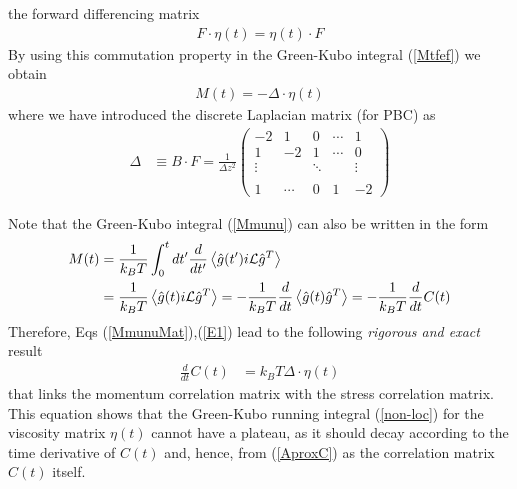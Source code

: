 \documentclass[a4paper,openright,12pt]{book}
\newcommand{\esc}{\!\cdot\!}
\newcommand{\llangle}{\left\langle}
\newcommand{\rrangle}{\right\rangle}
\begin{document}
the forward differencing matrix
\begin{align}
  F\esc\eta(t)=\eta(t)\esc F
\label{commute}
\end{align}
By using this commutation property 
 in the Green-Kubo
integral (\ref{Mtfef}) we obtain
\begin{align}
  M(t)=-\Delta\esc \eta(t)
\label{MmunuMat}
\end{align}
where we have introduced  the discrete Laplacian matrix (for PBC) as
\begin{align}
\Delta&\equiv  B\esc F
=\frac{1}{\Delta z^2}\left(
    \begin{array}{rrrrr}
-2&1&0&\cdots&1\\
1&-2&1&\cdots&0\\
\vdots      &&\ddots&&\vdots\\
\\
1&\cdots&0&1&-2    \end{array}
\right)
\end{align}

Note that the Green-Kubo integral (\ref{Mmunu}) can also be written
in the form
\begin{align}
    M(t)&= \frac{1}{k_BT} \int_0^t dt'\frac{d}{dt'}\llangle \hat{g}(t') i{\cal L}\hat{g}^T\rrangle
\nonumber\\
&= \frac{1}{k_BT} \llangle \hat{g}(t) i{\cal L}\hat{g}^T\rrangle
=  -\frac{1}{k_BT}\frac{d}{dt}\llangle \hat{g}(t) \hat{g}^T\rrangle=-\frac{1}{k_BT}\frac{d}{dt}C(t)
\label{E1}
\end{align}
Therefore,  Eqs  (\ref{MmunuMat}),(\ref{E1})  lead  to  the  following
\textit{rigorous and exact} result
\begin{align}
\frac{d}{dt}C(t)&= k_BT \Delta\esc \eta(t)
\label{etaExact}
\end{align}
that links the momentum correlation matrix with the stress correlation
matrix.  This  equation shows  that  the  Green-Kubo running  integral
(\ref{non-loc})  for  the viscosity  matrix  $\eta(t)$  cannot have  a
plateau, as it should decay according to the time derivative of $C(t)$
and,  hence, from  (\ref{AproxC})  as the  correlation matrix  $C(t)$
itself.
\end{document}
